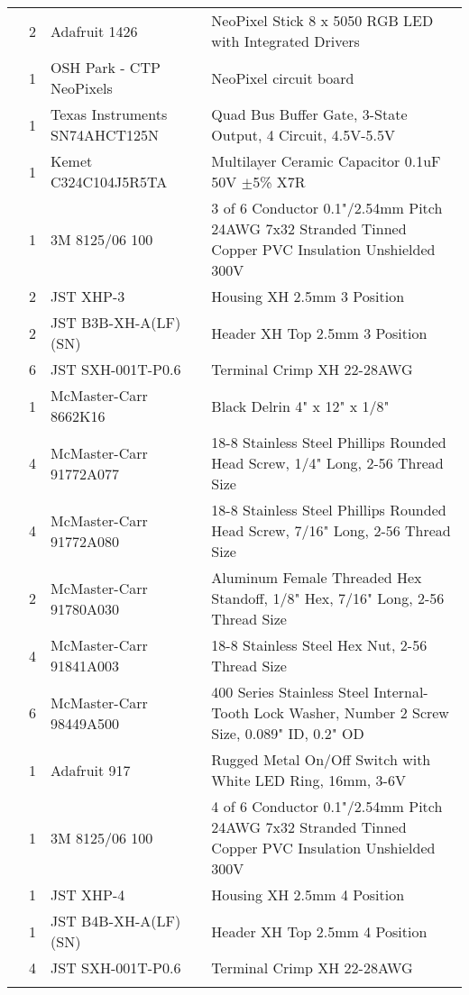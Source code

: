 \begin{longtabu}{X[3,c,m] X[1,c,m] X[3,c,m] X[5,l,m]}
   & 2 & Adafruit 1426 & NeoPixel Stick 8 x 5050 RGB LED with Integrated Drivers \\
  & 1 & OSH Park - CTP NeoPixels & NeoPixel circuit board \\
  & 1 & Texas Instruments SN74AHCT125N & Quad Bus Buffer Gate, 3-State Output, 4 Circuit, 4.5V-5.5V \\
  & 1 & Kemet C324C104J5R5TA & Multilayer Ceramic Capacitor 0.1uF 50V $\pm$5\% X7R \\
  & 1 & 3M 8125/06 100 & 3 of 6 Conductor 0.1"/2.54mm Pitch 24AWG 7x32 Stranded Tinned Copper PVC Insulation Unshielded 300V \\
  & 2 & JST XHP-3 & Housing XH 2.5mm 3 Position \\
  & 2 & JST B3B-XH-A(LF)(SN) & Header XH Top 2.5mm 3 Position \\
  & 6 & JST SXH-001T-P0.6 & Terminal Crimp XH 22-28AWG \\
  & 1 & McMaster-Carr 8662K16 & Black Delrin 4" x 12" x 1/8" \\
  & 4 & McMaster-Carr 91772A077 & 18-8 Stainless Steel Phillips Rounded Head Screw, 1/4" Long, 2-56 Thread Size \\
  & 4 & McMaster-Carr 91772A080 & 18-8 Stainless Steel Phillips Rounded Head Screw, 7/16" Long, 2-56 Thread Size \\
  & 2 & McMaster-Carr 91780A030 & Aluminum Female Threaded Hex Standoff, 1/8" Hex, 7/16" Long, 2-56 Thread Size \\
  & 4 & McMaster-Carr 91841A003 & 18-8 Stainless Steel Hex Nut, 2-56 Thread Size \\
  & 6 & McMaster-Carr 98449A500 & 400 Series Stainless Steel Internal-Tooth Lock Washer, Number 2 Screw Size, 0.089" ID, 0.2" OD \\ \mrule

   & 1 & Adafruit 917 & Rugged Metal On/Off Switch with White LED Ring, 16mm, 3-6V \\
  & 1 & 3M 8125/06 100 & 4 of 6 Conductor 0.1"/2.54mm Pitch 24AWG 7x32 Stranded Tinned Copper PVC Insulation Unshielded 300V \\
  & 1 & JST XHP-4 & Housing XH 2.5mm 4 Position \\
  & 1 & JST B4B-XH-A(LF)(SN) & Header XH Top 2.5mm 4 Position \\
  & 4 & JST SXH-001T-P0.6 & Terminal Crimp XH 22-28AWG \\ \mrule


\end{longtabu}
